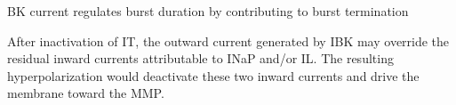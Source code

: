 \documentclass[11pt]{article}
\begin{document}
BK current regulates burst duration by contributing to burst termination \parencite{liuMultipleConductancesCooperatively2008}

After inactivation of IT, the outward current generated by IBK may override the residual
inward currents attributable to INaP and/or IL. The resulting hyperpolarization would
deactivate these two inward currents and drive the membrane toward the MMP. \parencite{liuMultipleConductancesCooperatively2008}














\end{document}
